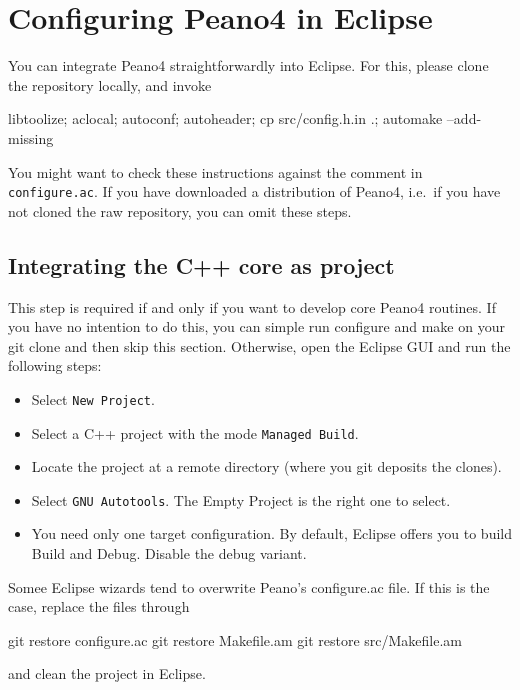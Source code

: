 \chapter{Configuring Peano4 in Eclipse}


You can integrate Peano4 straightforwardly into Eclipse. For this, please clone
the repository locally, and invoke

\begin{code}
libtoolize; aclocal; 
autoconf; autoheader; 
cp src/config.h.in .; 
automake --add-missing
\end{code}

\noindent
You might want to check these instructions against the comment in
\texttt{configure.ac}. If you have downloaded a distribution of Peano4,
i.e.~if you have not cloned the raw repository, you can omit these steps.


\section{Integrating the C++ core as project}

This step is required if and only if you want to develop core Peano4 routines.
If you have no intention to do this, you can simple run configure and make on
your git clone and then skip this section. 
Otherwise, open the Eclipse GUI and run the following steps:

\begin{itemize}
  \item Select \texttt{New Project}.
  \item Select a C++ project with the mode \texttt{Managed Build}.
  \item Locate the project at a remote directory (where you git deposits the
  clones).
  \item Select \texttt{GNU Autotools}. The Empty Project is the right one to select.
  \item You need only one target configuration. By default, Eclipse offers you to build Build and Debug. Disable the debug variant.  
\end{itemize}

\noindent
Somee Eclipse wizards tend to overwrite Peano's configure.ac file. If this is the 
case, replace the files through

\begin{code}
git restore  configure.ac
git restore  Makefile.am
git restore  src/Makefile.am
\end{code}

\noindent
and clean the project in Eclipse.


